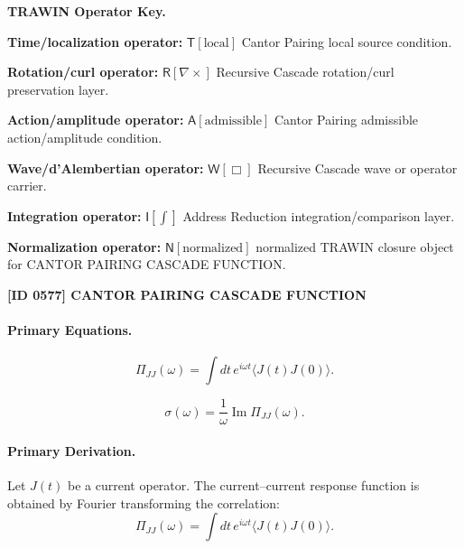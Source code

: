 \par\vspace{0.45\baselineskip}
\noindent\begin{minipage}[t]{\linewidth}
\begingroup
\small
\raggedright
\textbf{TRAWIN Operator Key.}\par
\noindent\textbf{Time/localization operator:} $\mathsf{T}\!\left[\mathrm{local}\right]$ Cantor Pairing local source condition.\par
\noindent\textbf{Rotation/curl operator:} $\mathsf{R}\!\left[\nabla\times\right]$ Recursive Cascade rotation/curl preservation layer.\par
\noindent\textbf{Action/amplitude operator:} $\mathsf{A}\!\left[\mathrm{admissible}\right]$ Cantor Pairing admissible action/amplitude condition.\par
\noindent\textbf{Wave/d'Alembertian operator:} $\mathsf{W}\!\left[\Box\right]$ Recursive Cascade wave or operator carrier.\par
\noindent\textbf{Integration operator:} $\mathsf{I}\!\left[\int\right]$ Address Reduction integration/comparison layer.\par
\noindent\textbf{Normalization operator:} $\mathsf{N}\!\left[\mathrm{normalized}\right]$ normalized TRAWIN closure object for CANTOR PAIRING CASCADE FUNCTION.\par
\endgroup
\end{minipage}

\clearpage
\noindent\textbf{[ID 0577] CANTOR PAIRING CASCADE FUNCTION}\par
\vspace{0.35em}
\paragraph{Primary Equations.}
\begin{equation}
\Pi_{JJ}(\omega)
=
\int
dt\,
e^{i\omega t}
\langle J(t)J(0)\rangle .
\end{equation}

\begin{equation}
\sigma(\omega)
=
\frac{1}{\omega}
\operatorname{Im}\Pi_{JJ}(\omega).
\end{equation}

\paragraph{Primary Derivation.}
Let $J(t)$ be a current operator.  
The current--current response function is obtained by Fourier transforming the correlation:
\begin{equation}
\Pi_{JJ}(\omega)
=
\int
dt\,
e^{i\omega t}
\langle J(t)J(0)\rangle .
\end{equation}

